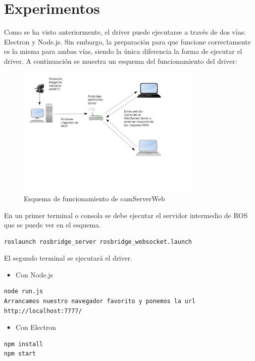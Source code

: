 \section{Experimentos}
Como se ha visto anteriormente, el driver puede ejecutarse a través de dos vías: Electron y Node.js. Sin embargo, la preparación para que funcione correctamente es la misma para ambas vías, siendo la única diferencia la forma de ejecutar el driver.
A continuación se muestra un esquema del funcionamiento del driver:
\begin{figure}[H]
  \begin{center}
    \includegraphics[width=0.8\textwidth]{figures/esquemacamserver.png}
		\caption{Esquema de funcionamiento de camServerWeb}
		\label{fig.esquemacamserver}
		\end{center}
\end{figure}
En un primer terminal o consola se debe ejecutar el servidor intermedio de ROS que se puede ver en el esquema.
\begin{lstlisting}[frame=single]
roslaunch rosbridge_server rosbridge_websocket.launch
\end{lstlisting}
El segundo terminal se ejecutará el driver.
\begin{itemize}
\item 
Con Node.js
\end{itemize}
\begin{lstlisting}[frame=single]
node run.js
Arrancamos nuestro navegador favorito y ponemos la url http://localhost:7777/
\end{lstlisting}
\begin{itemize}
\item 
Con Electron
\end{itemize}
\begin{lstlisting}[frame=single]
npm install
npm start
\end{lstlisting}
